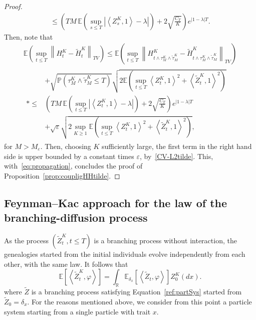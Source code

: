 \documentclass[AHL,Unicode,longabstracts,published]{cedram}
\renewcommand*\P{\mathbb{P}}
\newcommand*\R{\mathbb{R}}
\newcommand*\E{\mathbb{E}}
\begin{document}
\begin{proof}
\begin{multline*}
\leq \left(TM\, \E\left(\sup_{s \leq T} \left|\left\langle Z^K_s,1\right\rangle- \lambda \right|\right)+ 2 \sqrt{\frac{C_T }{K}} \right) e^{|1-\lambda| T}.
\end{multline*}
\endgroup
Then, note that
\begingroup
\allowdisplaybreaks
\begin{multline}
\E\left(\sup_{t \leq T}\left\| H^{K}_{t}-\widetilde{H}^{K}_{t} \right\|_{TV}\right)\leq\E\left(\sup_{t \leq T}\left\| H^{K}_{t \wedge \tau^K_M \wedge \widetilde{\tau}^K_M}-\widetilde{H}^{K}_{t \wedge \tau^K_M \wedge  \widetilde{\tau}^K_M}\right\|_{TV}\right) \\
\begin{aligned}
& + \sqrt{\P\left(\tau^K_M \wedge \widetilde{\tau}^K_M\leq T\right)} \sqrt{2 \E\left(\sup_{t \leq T}\left\langle Z^K_t,1\right\rangle^2 + \left\langle \widetilde{Z}^K_t,1\right\rangle^2\right)}\\*
\leq & \left(TM\, \E\left(\sup_{t \leq T} \left|\left\langle Z^K_t,1\right\rangle- \lambda \right|\right)+ 2 \sqrt{\frac{C_T }{K}} \right) e^{|1-\lambda| T}\\
&+\sqrt{\varepsilon} \sqrt{2 \sup_{K \geq 1}\E\left(\sup_{t \leq T}\left\langle Z^K_t,1\right\rangle^2 + \left\langle \widetilde{Z}^K_t,1\right\rangle^2\right)},
\end{aligned}
\end{multline}
\endgroup
for $M>M_\varepsilon$. Then, choosing $K$ sufficiently large, the first term in the right hand side is upper bounded by a constant times $\varepsilon$, by~\eqref{CV-L2tilde}. This, with~\eqref{eq:propagation}, concludes the proof of Proposition~\ref{prop:coupligHHtilde}.
\end{proof}



\subsection{Feynman--Kac approach for the law of the branching-diffusion process}

As the process $(\widetilde{Z}^{K}_{t},t\le T)$ is a branching process without interaction, the genealogies started from the initial individuals evolve independently from each other, with the same law. It follows that
\[
\E\left[\left\langle \widetilde{Z}_{t}^{K},\varphi\right\rangle\right]=\int_{\R} \E_{\delta_x}\left[\left\langle \widetilde{Z}_{t},\varphi\right\rangle \right] {Z}^{K}_{0}(dx).
\]
where $\widetilde{Z}$ is a branching process satisfying Equation~\eqref{ref:partSys} started from $\widetilde{Z}_{0}=\delta_{x}$. For the reasons mentioned above, we consider from this point a particle system starting from a single particle with trait $x$.
\end{document}
